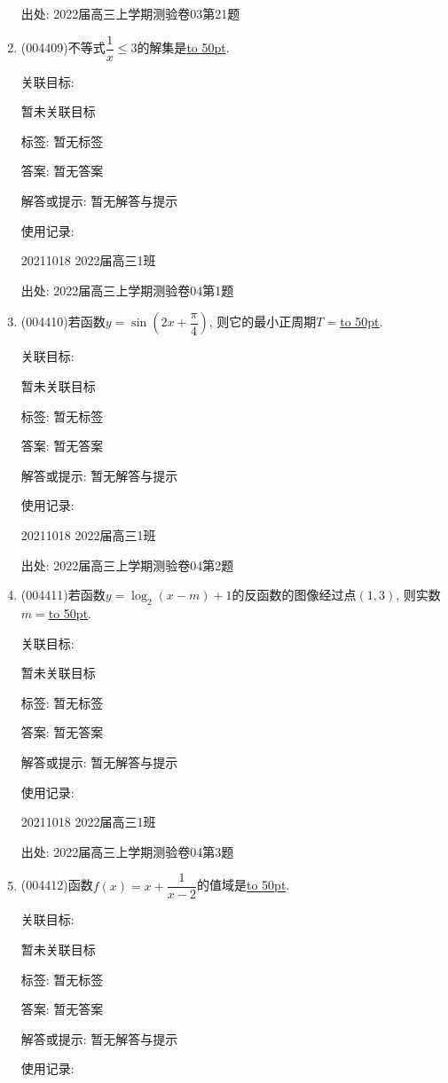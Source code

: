 \documentclass[10pt,a4paper]{article}
\newcommand{\blank}[1]{\underline{\hbox to #1pt{}}}
\begin{document}
\begin{enumerate}[1.]
出处: 2022届高三上学期测验卷03第21题
\item { (004409)}不等式$\dfrac 1x\le 3$的解集是\blank{50}.


关联目标:

暂未关联目标



标签: 暂无标签

答案: 暂无答案

解答或提示: 暂无解答与提示

使用记录:

20211018	2022届高三1班	


出处: 2022届高三上学期测验卷04第1题
\item { (004410)}若函数$y=\sin (2x+\dfrac{\pi }4)$, 则它的最小正周期$T=$\blank{50}.


关联目标:

暂未关联目标



标签: 暂无标签

答案: 暂无答案

解答或提示: 暂无解答与提示

使用记录:

20211018	2022届高三1班	


出处: 2022届高三上学期测验卷04第2题
\item { (004411)}若函数$y=\log_2(x-m)+1$的反函数的图像经过点$(1,3)$, 则实数$m=$\blank{50}.


关联目标:

暂未关联目标



标签: 暂无标签

答案: 暂无答案

解答或提示: 暂无解答与提示

使用记录:

20211018	2022届高三1班	


出处: 2022届高三上学期测验卷04第3题
\item { (004412)}函数$f(x)=x+\dfrac 1{x-2}$的值域是\blank{50}.


关联目标:

暂未关联目标



标签: 暂无标签

答案: 暂无答案

解答或提示: 暂无解答与提示

使用记录:


\end{enumerate}
\end{document}
